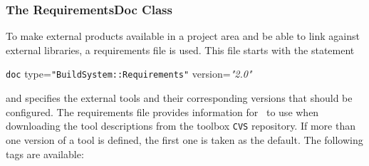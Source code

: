 \subsubsection{The RequirementsDoc Class}\label{sec:requirementsdocclass}

To make external products available in a project area and be able to
link against external libraries, a requirements file is used. This
file starts with the statement
\begin{tagprint}
  \lbkt\texttt{doc} type=\texttt{"BuildSystem::Requirements"}
  version=\textit{"2.0"}\rbkt
\end{tagprint}
\ni and specifies the external tools and their corresponding versions
that should be configured. The requirements file provides information
for \scram\ to use when downloading the tool descriptions from the
toolbox \texttt{CVS} repository. If more than one version of a tool is defined,
the first one is taken as the default.
The following tags are available:

